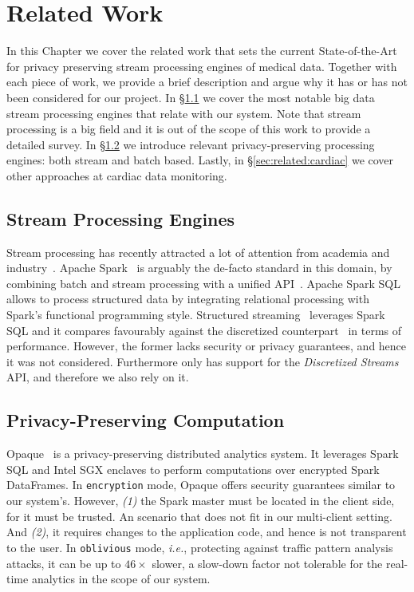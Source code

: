\chapter{Related Work} \label{chap:related-work}

In this Chapter we cover the related work that sets the current State-of-the-Art for privacy preserving stream processing engines of medical data.
Together with each piece of work, we provide a brief description and argue why it has or has not been considered for our project.
In \S\ref{sec:related:stream} we cover the most notable big data stream processing engines that relate with our system.
Note that stream processing is a big field and it is out of the scope of this work to provide a detailed survey.
In \S\ref{sec:related:privacy} we introduce relevant privacy-preserving processing engines: both stream and batch based.
Lastly, in \S\ref{sec:related:cardiac} we cover other approaches at cardiac data monitoring.

\section{Stream Processing Engines} \label{sec:related:stream}

Stream processing has recently attracted a lot of attention from academia and industry~\cite{Koliousis2016,Miao2017,Venkataraman2017}.
Apache Spark~\cite{Zaharia2012} is arguably the de-facto standard in this domain, by combining batch and stream processing with a unified API~\cite{ZahariaDStreams2012}.
Apache Spark SQL~\cite{Armbrust2015} allows to process structured data by integrating relational processing with Spark's functional programming style.
Structured streaming~\cite{Armbrust2018} leverages Spark SQL and it compares favourably against the discretized counterpart~\cite{ZahariaDStreams2012} in terms of performance. %
However, the former lacks security or privacy guarantees, and hence it was not considered.
Furthermore \sgxspark only has support for the \textit{Discretized Streams} API, and therefore we also rely on it.

\section{Privacy-Preserving Computation} \label{sec:related:privacy}

Opaque~\cite{Zheng2017} is a privacy-preserving distributed analytics system.
It leverages Spark SQL and Intel SGX enclaves to perform computations over encrypted Spark DataFrames.
In \texttt{encryption} mode, Opaque offers security guarantees similar to our system's.
However, \emph{(1)} the Spark master must be located in the client side, for it must be trusted. 
An scenario that does not fit in our multi-client setting.
And \emph{(2)}, it requires changes to the application code, and hence is not transparent to the user.
In \texttt{oblivious} mode, \emph{i.e.}, protecting against traffic pattern analysis attacks, it can be up to $46\times$ slower, a slow-down factor not tolerable for the real-time analytics in the scope of our system.

